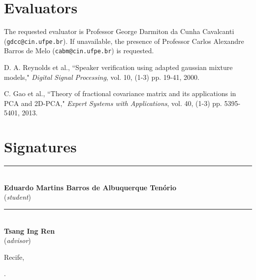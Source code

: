 \documentclass[a4paper,twocolumn]{article}
\begin{document}
\section{Evaluators}
\label{sec:eval}

The requested evaluator is Professor George Darmiton  da  Cunha  Cavalcanti (\texttt{gdcc@cin.ufpe.br}). If unavailable, the presence of Professor Carlos Alexandre Barros de Melo (\texttt{cabm@cin.ufpe.br}) is requested.


\begin{thebibliography}{9}
        D. A. Reynolds et al.,
        ``Speaker verification using adapted gaussian mixture models,"
        \textit{Digital Signal Processing}, vol. 10,
        (1-3) pp. 19-41,
        2000.

        C. Gao et al.,
        ``Theory of fractional covariance matrix and its applications in PCA and 2D-PCA,"
        \textit{Expert Systems with Applications}, vol. 40,
        (1-3) pp. 5395-5401,
        2013.
\end{thebibliography}

\newpage

\section*{Signatures}

\begin{center}
\vspace{3cm}

\rule{0.5\textwidth}{.4pt}\\
\textbf{Eduardo Martins Barros de Albuquerque Tenório}\\
(\textit{student})

\vspace{3cm}

\rule{0.5\textwidth}{.4pt}\\
\textbf{Tsang Ing Ren}\\
(\textit{advisor})
\end{center}

\noindent Recife, \date{\today}.
\end{document}
